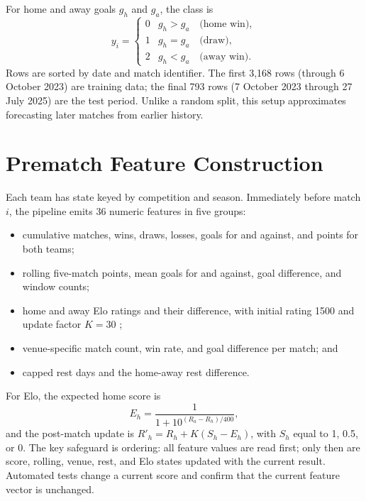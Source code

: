 \documentclass[10pt]{article}
\begin{document}
For home and away goals $g_h$ and $g_a$, the class is
\begin{equation}
y_i = \begin{cases}
0 & g_h > g_a \quad \text{(home win)},\\
1 & g_h = g_a \quad \text{(draw)},\\
2 & g_h < g_a \quad \text{(away win)}.
\end{cases}
\end{equation}
Rows are sorted by date and match identifier. The first 3,168 rows (through
6 October 2023) are training data; the final 793 rows (7 October 2023 through
27 July 2025) are the test period. Unlike a random split, this setup approximates
forecasting later matches from earlier history.

\section{Prematch Feature Construction}

Each team has state keyed by competition and season. Immediately before match
$i$, the pipeline emits 36 numeric features in five groups:

\begin{itemize}
  \item cumulative matches, wins, draws, losses, goals for and against, and
  points for both teams;
  \item rolling five-match points, mean goals for and against, goal difference,
  and window counts;
  \item home and away Elo ratings and their difference, with initial rating
  1500 and update factor $K=30$ \cite{elo1978};
  \item venue-specific match count, win rate, and goal difference per match; and
  \item capped rest days and the home-away rest difference.
\end{itemize}

For Elo, the expected home score is
\begin{equation}
E_h = \frac{1}{1 + 10^{(R_a-R_h)/400}},
\end{equation}
and the post-match update is $R'_h = R_h + K(S_h-E_h)$, with $S_h$ equal to 1,
0.5, or 0. The key safeguard is ordering: all feature values are read first;
only then are score, rolling, venue, rest, and Elo states updated with the current
result. Automated tests change a current score and confirm that the current
feature vector is unchanged.
\end{document}
